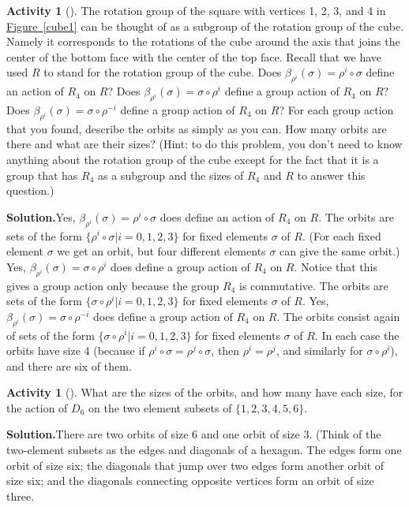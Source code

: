 \documentclass[10pt,]{book}
\theoremstyle{plain}
\theoremstyle{definition}
\newtheorem{activity}[project]{Activity}
\numberwithin{equation}{chapter}
\begin{document}
\begin{activity}[]\label{cosets1}
The rotation group of the square with vertices 1, 2, 3, and 4 in \hyperref[cube1]{Figure~\ref{cube1}} can be thought of as a subgroup of the rotation group of the cube. Namely it corresponds to the rotations of the cube around the axis that joins the center of the bottom face with the center of the top face. Recall that we have used \(R\) to stand for the rotation group of the cube. Does \(\beta_{\rho^i}(\sigma)=\rho^i\circ
\sigma\) define an action of \(R_4\) on \(R\)? Does \(\beta_{\rho^i}(\sigma) =
\sigma\circ\rho^i\) define a group action of \(R_4\) on \(R\)? Does \(\beta_{\rho^i}(\sigma) =
\sigma\circ\rho^{-i}\) define a group action of \(R_4\) on \(R\)? For each group action that you found, describe the orbits as simply as you can. How many orbits are there and what are their sizes? (Hint: to do this problem, you don't need to know anything about the rotation group of the cube except for the fact that it is a group that has \(R_4\) as a subgroup and the sizes of \(R_4\) and \(R\) to answer this question.)%
\par\medskip\noindent%
\textbf{Solution.}\quad Yes, \(\beta_{\rho^i}(\sigma)=\rho^i\circ
\sigma\) does define an action of \(R_4\) on \(R\). The orbits are sets of the form \(\{\rho^i\circ\sigma|i=0,1,2,3\}\) for fixed elements \(\sigma\) of \(R\). (For each fixed element \(\sigma\) we get an orbit, but four different elements \(\sigma\) can give the same orbit.) Yes, \(\beta_{\rho^i}(\sigma) =
\sigma\circ\rho^{i}\) does define a group action of \(R_4\) on \(R\). Notice that this gives a group action only because the group \(R_4\) is commutative. The orbits are sets of the form \(\{\sigma\circ\rho^i|i=0,1,2,3\}\) for fixed elements \(\sigma\) of \(R\). Yes, \(\beta_{\rho^i}(\sigma) =
\sigma\circ\rho^{-i}\) does define a group action of \(R_4\) on \(R\). The orbits consist again of sets of the form \(\{\sigma\circ\rho^i|i=0,1,2,3\}\) for fixed elements \(\sigma\) of \(R\). In each case the orbits have size 4 (because if \(\rho^i\circ\sigma=\rho^j\circ\sigma\), then \(\rho^i =\rho^j\), and similarly for \(\sigma\circ\rho^i\)), and there are six of them.%
\end{activity}
\begin{activity}[]\label{activity-276}
What are the sizes of the orbits, and how many have each size, for the action of \(D_6\) on the two element subsets of \(\{1,2,3,4,5,6\}\).%
\par\medskip\noindent%
\textbf{Solution.}\quad There are two orbits of size 6 and one orbit of size 3. (Think of the two-element subsets as the edges and diagonals of a hexagon. The edges form one orbit of size six; the diagonals that jump over two edges form another orbit of size six; and the diagonals connecting opposite vertices form an orbit of size three.%
\end{activity}
\end{document}
